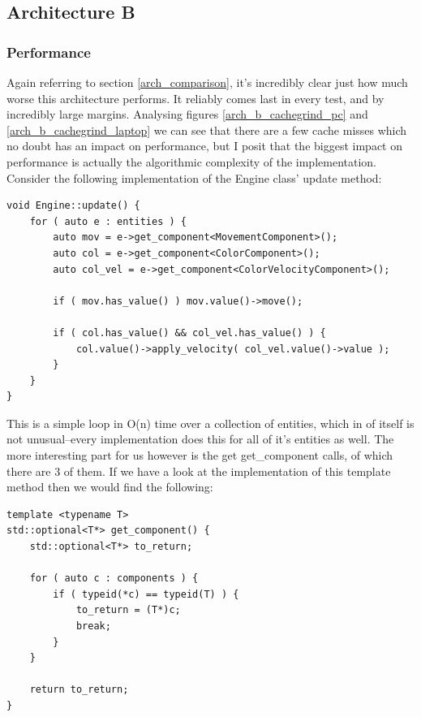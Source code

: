 \documentclass{article}
\begin{document}
\subsection{Architecture B}
\subsubsection{Performance}
Again referring to section \ref{arch_comparison}, it's incredibly clear just
how much worse this architecture performs. It reliably comes last in every test,
and by incredibly large margins. Analysing figures \ref{arch_b_cachegrind_pc}
and \ref{arch_b_cachegrind_laptop} we can see that there are a few cache misses
which no doubt has an impact on performance, but I posit that the biggest impact
on performance is actually the algorithmic complexity of the implementation.
Consider the following implementation of the Engine class' update method:

\bigskip

\begin{BVerbatim}
void Engine::update() {
    for ( auto e : entities ) {
        auto mov = e->get_component<MovementComponent>();
        auto col = e->get_component<ColorComponent>();
        auto col_vel = e->get_component<ColorVelocityComponent>();

        if ( mov.has_value() ) mov.value()->move();

        if ( col.has_value() && col_vel.has_value() ) {
            col.value()->apply_velocity( col_vel.value()->value );
        }
    }
}
\end{BVerbatim}

\bigskip

This is a simple loop in O(n) time over a collection of entities, which in of
itself is not unusual--every implementation does this for all of it's entities
as well. The more interesting part for us however is the get get\_component
calls, of which there are 3 of them. If we have a look at the implementation of
this template method then we would find the following:

\bigskip

\begin{BVerbatim}
template <typename T>
std::optional<T*> get_component() {
    std::optional<T*> to_return;

    for ( auto c : components ) {
        if ( typeid(*c) == typeid(T) ) {
            to_return = (T*)c;
            break;
        }
    }

    return to_return;
}
\end{BVerbatim}
\end{document}
